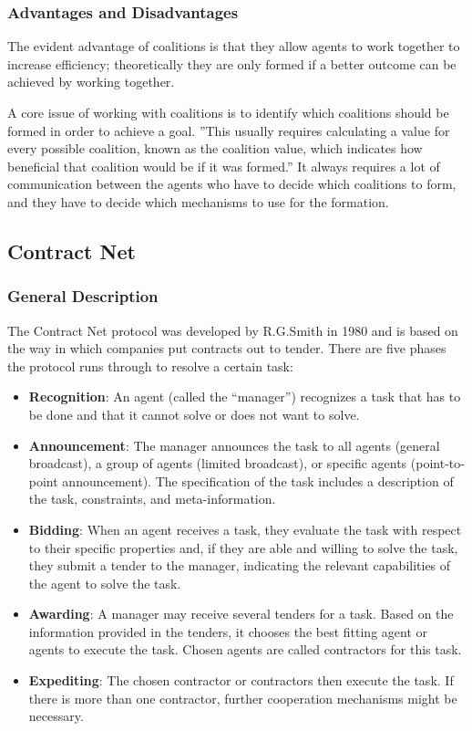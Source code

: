 \subsubsection{Advantages and Disadvantages}

The evident advantage of coalitions is that they allow agents to work together to increase efficiency; theoretically they are only formed if a better outcome can be achieved by working together. 

A core issue of working with coalitions is to identify which coalitions should be formed in order to achieve a goal. ''This usually requires calculating a value for every possible coalition, known as the coalition value, which indicates how beneficial that coalition would be if it was formed.'' \cite{Rahwan:2007} It always requires a lot of communication between the agents who have to decide which coalitions to form, and they have to decide which mechanisms to use for the formation. 



\subsection{Contract Net}

\subsubsection{General Description}

The Contract Net protocol was developed by R.G.Smith in 1980 \cite{Smith:1980:CNP:1311969.1312903} and is based on the way in which companies put contracts out to tender. There are five phases the protocol runs through to resolve a certain task:

\begin{itemize}
	\item \textbf{Recognition}: An agent (called the ``manager'') recognizes a task that has to be done and that it cannot solve or does not want to solve.
	\item \textbf{Announcement}: The manager announces the task to all agents (general broadcast), a group of agents (limited broadcast), or specific agents (point-to-point announcement). The specification of the task includes a description of the task, constraints, and meta-information.
	\item \textbf{Bidding}: When an agent receives a task, they evaluate the task with respect to their specific properties and, if they are able and willing to solve the task, they submit a tender to the manager, indicating the relevant capabilities of the agent to solve the task.
	\item \textbf{Awarding}: A manager may receive several tenders for a task. Based on the information provided in the tenders, it chooses the best fitting agent or agents to execute the task. Chosen agents are called contractors for this task.
	\item \textbf{Expediting}: The chosen contractor or contractors then execute the task. If there is more than one contractor, further cooperation mechanisms might be necessary.
\end{itemize}

